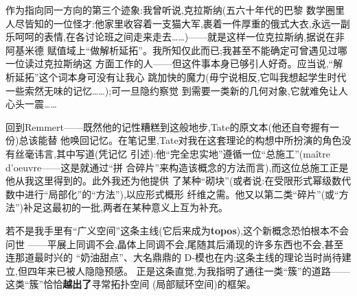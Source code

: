 
作为指向同一方向的第三个迹象:我曾听说,克拉斯纳(五六十年代的巴黎
数学圈里人尽皆知的一位怪才:他家里收容着一支猫大军,裹着一件厚重的俄式大衣,永远一副
乐呵呵的表情,在各讨论班之间走来走去……)——就是这样一位克拉斯纳,据说在非阿基米德
赋值域上“做解析延拓”。我所知仅此而已;我甚至不能确定可曾遇见过哪一位读过克拉斯纳这
方面工作的人——但这件事本身已够引人好奇。应当说,“解析延拓”这个词本身可没有让我心
跳加快的魔力(毋宁说相反,它叫我想起学生时代一些索然无味的记忆……);可一旦隐约察觉
到需要一类新的几何对象,它就难免让人心头一震……

回到Remmert——既然他的记性糟糕到这般地步,Tate的原文本(他还自夸握有一份)总该能替
他唤回记忆。在笔记里,Tate对我在这套理论的构想中\dmark{}所扮演的角色没有丝毫讳言,其中写道(凭记忆
引述):他“完全忠实地”遵循一位“总施工”(maître d'oeuvre——这是就通过“拼
合碎片”来构造该概念的方法而言),而这位总施工正是他从我这里得到的。此外我还为他提供
了某种“砌块”(或者说:在受限形式幂级数代数中进行“局部化”的“方法”),以应形式概形
纤维之需。他又以第二类“碎片”(或“方法”)补足这最初的一批,两者在某种意义上互为补充。

若不是我手里有“广义空间”这条主线(它后来成为\textbf{topos}),这个新概念恐怕根本不会问世
——平展上同调不会,晶体上同调不会,尾随其后涌现的许多东西也不会,甚至连那道最时兴的
“奶油甜点”、大名鼎鼎的 D-模也在内;这条主线的理论当时尚待建立,但四年来已被人隐隐预感。
正是这条直觉,为我指明了通往一类“簇”的道路——这类“簇”恰恰\textbf{越出了}寻常拓扑空间
(局部赋环空间)的框架。

